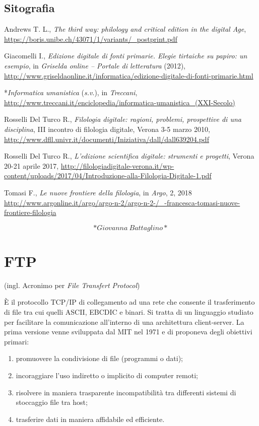 \documentclass[
  b5paper,
  twoside,
  12pt,
  chapterprefix=false,
  bibliography=totocnumbered,
  parskip=false]{scrbook}
\begin{document}
\hypertarget{sitografia-13}{%
\section*{Sitografia}\label{sitografia-13}}

Andrews T. L., \emph{The third way: philology and critical edition in the
digital Age},
\url{https://boris.unibe.ch/43071/1/variants/_postprint.pdf}~

Giacomelli I., \emph{Edizione digitale di fonti primarie. Elegie tirtaiche su
papiro: un esempio}, in \emph{Griselda online -- Portale di letteratura}
(2012),
\url{http://www.griseldaonline.it/informatica/edizione-digitale-di-fonti-primarie.html}

*\emph{Informatica umanistica} (\emph{s.v}.), in \emph{Treccani},
\url{http://www.treccani.it/enciclopedia/informatica-umanistica_(XXI-Secolo)}

Rosselli Del Turco R., \emph{Filologia digitale: ragioni, problemi,
prospettive di una disciplina}, III incontro di filologia digitale,
Verona 3-5 marzo 2010,
\url{http://www.dfll.univr.it/documenti/Iniziativa/dall/dall639204.pdf}

Rosselli Del Turco R., \emph{L'edizione scientifica digitale: strumenti e
progetti}, Verona 20-21 aprile 2017,
\url{http://filologiadigitale-verona.it/wp-content/uploads/2017/04/Introduzione-alla-Filologia-Digitale-1.pdf}

Tomasi F., \emph{Le nuove frontiere della filologia}, in \emph{Argo}, 2, 2018
\url{http://www.argonline.it/argo/argo-n-2/argo-n-2-/_-francesca-tomasi-nuove-frontiere-filologia}

\[*Giovanna~Battaglino*\]

\hypertarget{ftp}{%
\chapter{FTP}\label{ftp}}

(ingl. Acronimo per \emph{File Transfert Protocol})

È il protocollo TCP/IP di collegamento ad una rete che consente il
trasferimento di file tra cui quelli ASCII, EBCDIC e binari. Si tratta
di un linguaggio studiato per facilitare la comunicazione all'interno di
una architettura client-server. La prima versione venne sviluppata dal
MIT nel 1971 e di proponeva degli obiettivi primari:

\begin{enumerate}
\def\labelenumi{\arabic{enumi}.}
\item
  promuovere la condivisione di file (programmi o dati);
\item
  incoraggiare l'uso indiretto o implicito di computer remoti;
\item
  risolvere in maniera trasparente incompatibilità tra differenti
  sistemi di stoccaggio file tra host;
\item
  trasferire dati in maniera affidabile ed efficiente.
\end{enumerate}
\end{document}
